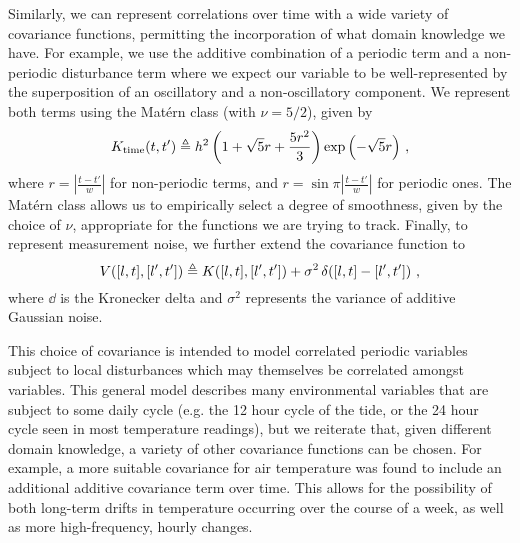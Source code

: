 \documentclass{acmtrans2m}
\begin{document}
Similarly, we can represent correlations over time with a wide variety of covariance functions, permitting the incorporation of what domain knowledge we have. For example, we use the additive combination of a periodic term and a non-periodic disturbance term where we expect our variable to be well-represented by the superposition of an oscillatory and a non-oscillatory component. We represent both terms using the Mat\'{e}rn class \cite{GPsBook} (with $\nu=5/2$), given by
\begin{equation} \label{eq:matern}
K_\text{time}(t,t') \triangleq h^2 \left(1+\sqrt{5}r+\frac{5r^2}{3}\right)\exp\left(-\sqrt{5}r\right)\,,
\end{equation}
where $r = \left|\frac{t-t'}{w}\right|$ for non-periodic terms, and $r = \sin \pi \left|\frac{t-t'}{w}\right|$ for periodic ones. The Mat\'{e}rn class allows us to empirically select a degree of smoothness, given by the choice of $\nu$, appropriate for the functions we are trying to track. Finally, to represent measurement noise, we further extend the covariance function to
\small\begin{equation}
V([l,t],[l',t'])\triangleq K([l,t],[l',t'])+ \sigma^2\,\delta\!\left([l,t]-[l',t']\right)\,,
\end{equation}\normalsize
where $\dd{}{}$ is the Kronecker delta and $\sigma^2$ represents the variance of additive Gaussian noise.

This choice of covariance is intended to model correlated periodic variables subject to local disturbances which may themselves be correlated amongst variables. This general model describes many environmental variables that are subject to some daily cycle (e.g. the 12 hour cycle of the tide, or the 24 hour cycle seen in most temperature readings), but we reiterate that, given different domain knowledge, a variety of other covariance functions can be chosen. For example, a more suitable covariance for air temperature was found to include an additional additive covariance term over time. This allows for the possibility of both long-term drifts in temperature occurring over the course of a week, as well as more high-frequency, hourly changes.
\end{document}
